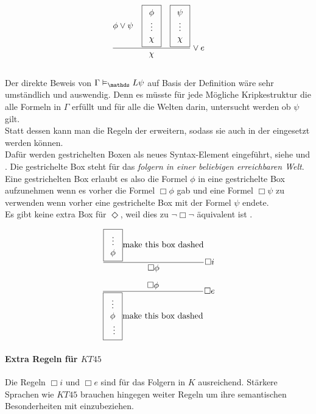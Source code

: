 \begin{equation}
	\label{eq:eDisjunction}
	\frac{
		\phi \vee \psi 
		\quad \boxed{ \begin{array}{c} \phi\\ \vdots\\ \chi \end{array} } 
		\quad \boxed{ \begin{array}{c} \psi\\ \vdots\\ \chi \end{array} }
	}
	{\chi}
	\vee e
\end{equation}

\subsection{\ND \ML} %
\label{par:natuerliche_deduktion_ml}
Der direkte Beweis von $\Gamma \vDash_\Menge{L} \psi$ auf Basis der Definition wäre sehr umständlich und auswendig.
Denn es müsste für jede Mögliche Kripkestruktur die alle Formeln in $\Gamma$ erfüllt und für alle die Welten darin, untersucht werden ob $\psi$ gilt.\\
Statt dessen kann man die Regeln der \ND erweitern, sodass sie auch in der \ML eingesetzt werden können.\\
Dafür werden gestrichelten Boxen als neues Syntax-Element eingeführt, siehe  und .
Die gestrichelte Box steht für das \emph{folgern in einer beliebigen erreichbaren Welt}.\\
Eine gestrichelten Box erlaubt es also die Formel $\phi$ in eine gestrichelte Box aufzunehmen wenn es vorher die Formel $\Box \phi$ gab und eine Formel $\Box \psi$ zu verwenden wenn vorher eine gestrichelte Box mit der Formel $\psi$ endete.\\
Es gibt keine extra Box für $\Diamond$, weil dies zu $\neg \Box \neg$ äquivalent ist
\cite[329f]{huth2004logic}.

\begin{equation}
	\label{eq:iBox}
	\frac{\boxed{ \begin{array}{c} \vdots \\ \phi \end{array} } \text{make this box dashed}}{ \Box \phi} \Box i 
\end{equation}

\begin{equation}
	\label{eq:eBox}
	\frac{\Box \phi}{\dashedBox{\vdots \\ \phi \\ \vdots}} \Box e
\end{equation}


\paragraph{Extra Regeln für $KT45$} %
\label{par:extra_regeln_für_kt45_}
Die Regeln $\Box i$ und $\Box e$ sind für das Folgern in $K$ ausreichend.
Stärkere Sprachen wie $KT45$ brauchen hingegen weiter Regeln um ihre semantischen Besonderheiten mit einzubeziehen. 

